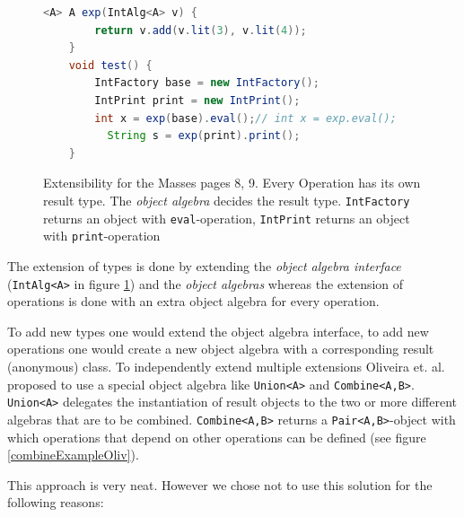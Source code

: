\documentclass{report}
\begin{document}
\begin{figure}[h]
\begin{lstlisting}[language=java]
    <A> A exp(IntAlg<A> v) {
        return v.add(v.lit(3), v.lit(4));
    }
    void test() {
        IntFactory base = new IntFactory();
        IntPrint print = new IntPrint();
        int x = exp(base).eval();// int x = exp.eval();
￼￼        String s = exp(print).print();
    }
\end{lstlisting}
\caption{Extensibility for the Masses \cite{Oliv-Extensibility-2012} pages 8, 9. Every Operation has its own result type. The \emph{object algebra} decides the result type. \lstinline{IntFactory} returns an object with \lstinline{eval}-operation, \lstinline{IntPrint} returns an object with \lstinline{print}-operation}
\label{differentAlgebras}
\end{figure}

The extension of types is done by extending the \emph{object algebra interface} (\lstinline{IntAlg<A>} in figure \ref{differentAlgebras}) and the \emph{object algebras} whereas the extension of operations is done with an extra object algebra for every operation.

To add new types one would extend the object algebra interface, to add new operations one would create a new object algebra with a corresponding result (anonymous) class. To independently extend multiple extensions Oliveira et. al. proposed to use a special object algebra like \lstinline{Union<A>} and \lstinline{Combine<A,B>}. \lstinline{Union<A>} delegates the instantiation of result objects to the two or more different algebras that are to be combined. \lstinline{Combine<A,B>} returns a \lstinline{Pair<A,B>}-object with which operations that depend on other operations can be defined (see figure \ref{combineExampleOliv}).

This approach is very neat. However we chose not to use this solution for the following reasons:
\end{document}

